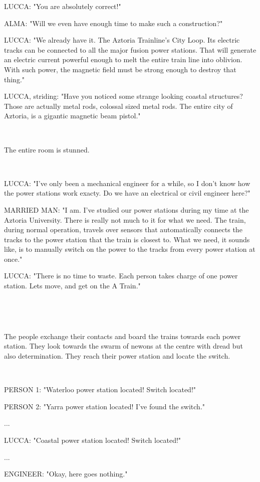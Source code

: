 \documentclass[11pt]{article}
\begin{document}
LUCCA: "You are absolutely correct!"

ALMA: "Will we even have enough time to make such a construction?"

LUCCA: "We already have it. 
The Aztoria Trainline's City Loop. 
Its electric tracks can be connected to all the major fusion power stations.
That will generate an electric current powerful enough to melt the entire train line into oblivion. 
With such power, the magnetic field must be strong enough to destroy that thing."

LUCCA, striding: "Have you noticed some strange looking coastal structures? 
Those are actually metal rods, colossal sized metal rods.
The entire city of Aztoria, is a gigantic magnetic beam pistol."

\ 

The entire room is stunned. 

\ 

LUCCA: "I've only been a mechanical engineer for a while, so I don't know how the power stations work exacty. Do we have an electrical or civil engineer here?"

MARRIED MAN: "I am. 
I've studied our power stations during my time at the Aztoria University.
There is really not much to it for what we need. 
The train, during normal operation, travels over sensors that automatically connects the tracks to the power station that the train is closest to.
What we need, it sounds like, is to manually switch on the power to the tracks from every power station at once." 

LUCCA: "There is no time to waste. 
Each person takes charge of one power station.
Lets move, and get on the A Train."

\ 

\ 

The people exchange their contacts and board the trains towards each power station.
They look towards the swarm of newons at the centre with dread but also determination.
They reach their power station and locate the switch. 

\ 

PERSON 1: "Waterloo power station located! Switch located!"

PERSON 2: "Yarra power station located! I've found the switch." 

...

LUCCA: "Coastal power station located! Switch located!"

...

ENGINEER: "Okay, here goes nothing."
\end{document}
